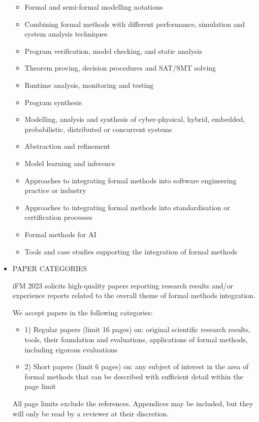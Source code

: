 \documentclass[prodmode,acmtecs]{acmsmall} %
\begin{document}
\begin{itemize}
\begin{itemize}\item  Formal and semi-formal modelling notations 
\item  Combining formal methods with different performance, simulation and system analysis techniques 
\item  Program verification, model checking, and static analysis 
\item  Theorem proving, decision procedures and SAT/SMT solving 
\item  Runtime analysis, monitoring and testing 
\item  Program synthesis 
\item  Modelling, analysis and synthesis of cyber-physical, hybrid, embedded, probabilistic, distributed or concurrent systems 
\item  Abstraction and refinement 
\item  Model learning and inference 
\item  Approaches to integrating formal methods into software engineering practice or industry 
\item  Approaches to integrating formal methods into standardisation or certification processes 
\item  Formal methods for AI 
\item  Tools and case studies supporting the integration of formal methods 
\end{itemize} 
\item  PAPER CATEGORIES  
 
  iFM 2023 solicits high-quality papers reporting research results and/or experience reports related to the overall theme of formal methods integration. 
 
  We accept papers in the following categories: 
 
\begin{itemize}\item  1) Regular papers (limit 16 pages) on: original scientific research results, tools, their foundation and evaluations, applications of formal methods, including rigorous evaluations
\item  2) Short papers (limit 6 pages) on: any subject of interest in the area of formal methods that can be described with sufficient detail within the page limit
\end{itemize} 
  All page limits exclude the references. Appendices may be included, but they will only be read by a reviewer at their discretion. 
 

\end{itemize}
\end{document}
